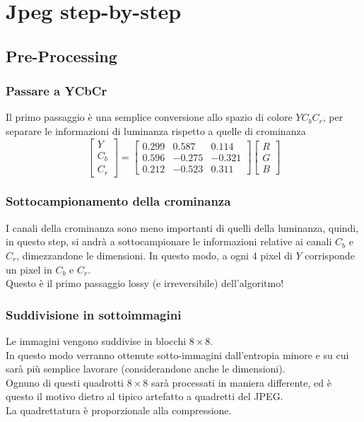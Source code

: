 \documentclass{report}
\begin{document}
	\newpage
		
	\section{Jpeg step-by-step}
	\subsection{Pre-Processing}
	\subsubsection{Passare a YCbCr}
	Il primo passaggio è una semplice conversione allo spazio di colore $YC_bC_r$, per separare le informazioni di luminanza rispetto a quelle di crominanza
	$$
	\begin{bmatrix}
		Y   \\
		C_b \\
		C_r 
	\end{bmatrix}
	=
	\begin{bmatrix}
		0.299 & 0.587  & 0.114  \\
		0.596 & -0.275 & -0.321 \\
		0.212 & -0.523 & 0.311  
	\end{bmatrix}
	\begin{bmatrix}
		R \\
		G \\
		B 
	\end{bmatrix}
	$$
	\subsubsection{Sottocampionamento della crominanza}
	I canali della crominanza sono meno importanti di quelli della luminanza, quindi, in questo step, si andrà a sottocampionare le informazioni relative ai canali $C_b$ e $C_r$, dimezzandone le dimensioni.
	In questo modo, a ogni 4 pixel di $Y$ corrisponde un pixel in $C_b$ e $C_r$.\\
	Questo è il primo passaggio lossy (e irreversibile) dell'algoritmo!
		
	\subsubsection{Suddivisione in sottoimmagini}
	Le immagini vengono suddivise in blocchi $8\times 8$.\\
	In questo modo verranno ottenute sotto-immagini dall'entropia minore e su cui sarà più semplice lavorare (considerandone anche le dimensioni).\\
	Ognuno di questi quadrotti $8\times 8$ sarà processati in maniera differente, ed è questo il motivo dietro al tipico artefatto a quadretti del JPEG.\\
	La quadrettatura è proporzionale alla compressione.
		
\end{document}

